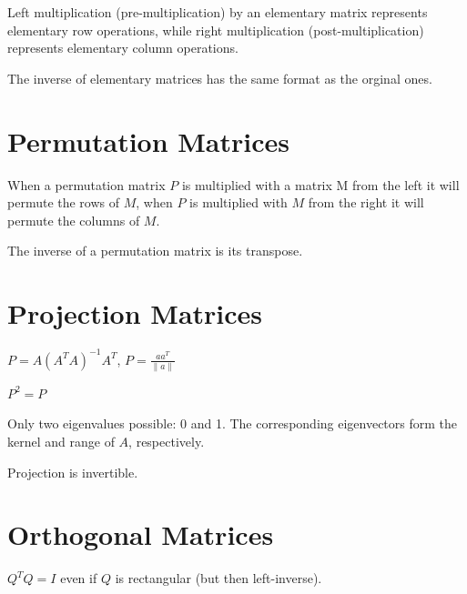{\begin{rmk}
	Left multiplication (pre-multiplication) by an elementary matrix represents elementary row operations, while right multiplication (post-multiplication) represents elementary column operations.
\end{rmk}

\begin{rmk}
	The inverse of elementary matrices has the same format as the orginal ones.
\end{rmk}

\section{Permutation  Matrices}
\begin{rmk}
	When a permutation matrix $P$ is multiplied with a matrix M from the left it will permute the rows of $M$, when $P$ is multiplied with $M$ from the right it will permute the columns of $M$.
\end{rmk}

\begin{rmk}
	The inverse of a permutation matrix is its transpose.
\end{rmk}

\section{Projection Matrices}
\begin{rmk}
	$P = A(A^TA)^{-1}A^T$, $P = \frac{aa^T}{\|a\|}$
\end{rmk}

\begin{rmk}
	$P^2=P$
\end{rmk}

\begin{rmk}
	Only two eigenvalues possible: 0 and 1. The corresponding eigenvectors form the kernel and range of $A$, respectively.
\end{rmk}

\begin{rmk}
	Projection is invertible.
\end{rmk}

\section{Orthogonal Matrices}

\begin{rmk}
	$Q^TQ = I$ even if $Q$ is rectangular (but then left-inverse).
\end{rmk}

}
